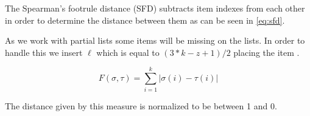The Spearman's footrule distance (SFD) subtracts item indexes from each other in order to determine the distance between them as can be seen in \ref{eq:sfd}. 

As we work with partial lists some items will be missing on the lists. In order to handle this we insert $\ell$ which is equal to $(3 * k - z + 1)/2$ placing the item .  

\begin{equation}\label{eq:sfd}
F(\sigma, \tau) = \sum_{i=1}^{k} | \sigma (i) - \tau (i) |
\end{equation}

The distance given by this measure is normalized to be between 1 and 0. 
